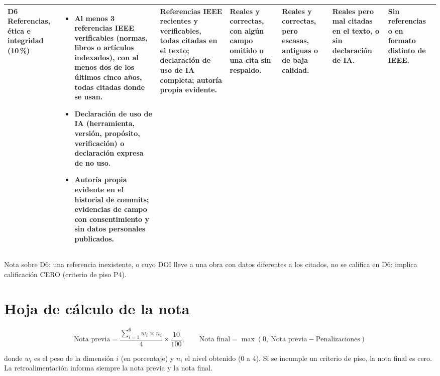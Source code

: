 \documentclass[11pt]{article}
\newcommand{\seccion}[1]{\section{\textcolor{utegreendk}{#1}}}
\begin{document}
\begin{landscape}
{\begin{longtable}{|L{2.4cm}|L{5.6cm}|L{3.1cm}|L{2.8cm}|L{2.8cm}|L{2.7cm}|L{2.1cm}|}
	\hline
	\textbf{D6 Referencias, ética e integridad} (10\,\%) & \begin{itemize}[leftmargin=9pt,itemsep=0pt,topsep=0pt,parsep=0pt,partopsep=0pt,after=\vspace{-\baselineskip}]\item Al menos 3 referencias IEEE verificables (normas, libros o artículos indexados), con al menos dos de los últimos cinco años, todas citadas donde se usan.\item Declaración de uso de IA (herramienta, versión, propósito, verificación) o declaración expresa de no uso.\item Autoría propia evidente en el historial de commits; evidencias de campo con consentimiento y sin datos personales publicados.\end{itemize} & Referencias IEEE recientes y verificables, todas citadas en el texto; declaración de uso de IA completa; autoría propia evidente. & Reales y correctas, con algún campo omitido o una cita sin respaldo. & Reales y correctas, pero escasas, antiguas o de baja calidad. & Reales pero mal citadas en el texto, o sin declaración de IA. & Sin referencias o en formato distinto de IEEE.\\
	\hline
\end{longtable}
}
{\footnotesize Nota sobre D6: una referencia inexistente, o cuyo DOI lleve a una obra con datos diferentes a los citados, no se califica en D6: implica calificación CERO (criterio de piso P4).}
\end{landscape}

\seccion{Hoja de cálculo de la nota}

\[
	\text{Nota previa} = \frac{\sum_{i=1}^{6} w_i \times n_i}{4} \times \frac{10}{100}, \qquad \text{Nota final} = \max\left(0,\ \text{Nota previa} - \text{Penalizaciones}\right)
\]

donde $w_i$ es el peso de la dimensión $i$ (en porcentaje) y $n_i$ el nivel obtenido (0 a 4). Si se incumple un criterio de piso, la nota final es cero. La retroalimentación informa siempre la nota previa y la nota final.
\end{document}
